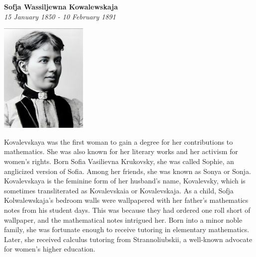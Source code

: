 \documentclass[12pt,a4paper]{article}
\begin{document}
   
    \begin{center}
        \textbf{\Large Sofja Wassiljewna Kowalewskaja}\\
        \vspace{5pt}
        \textit{15 January 1850 - 10 February 1891} \\
        \vspace{20pt}
    \end{center}
    
 \begin{flushleft}
        \includegraphics[height=150pt]{images/bios/Kowalewskaja.png}
    \end{flushleft}




\vspace{2cm}
Kovalevskaya was the first woman to gain a degree for her contributions to mathematics. She was also known for her literary works and her activism for women's rights. Born Sofia Vasilievna Krukovsky, she was called Sophie, an anglicized version of Sofia. Among her friends, she was known as Sonya or Sonja. Kovalevskaya is the feminine form of her husband's name, Kovalevsky, which is sometimes transliterated as Kovalevskaia or Kovalevskaja.
As a child, Sofja Kolwalewskaja's bedroom walls were wallpapered with her father's mathematics notes from his student days. This was because they had ordered one roll short of wallpaper, and the mathematical notes intrigued her. Born into a minor noble family, she was fortunate enough to receive tutoring in elementary mathematics. Later, she received calculus tutoring from Strannoliubskii, a well-known advocate for women's higher education.
\end{document}
